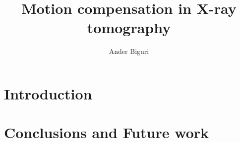 \documentclass[11pt]{report}
\title{Motion compensation in X-ray tomography}
\author{Ander Biguri}
\begin{document}
\maketitle



\tableofcontents

\chapter{Introduction}\label{ch:intro}

\label{ch:rec}


\label{ch:GPU}
\label{ch:apllications}


\label{ch:motion analisis}
\chapter{Conclusions and Future work}\label{ch:conclusions}



\end{document}
